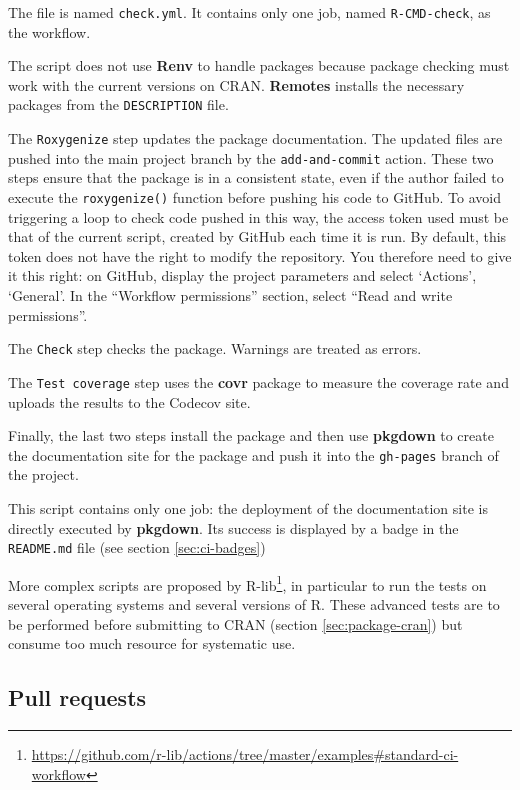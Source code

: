 \documentclass[
  12pt,
  american,
  a4paper,
  extrafontsizes,onecolumn,openright
  ]{memoir}
\newlength{\rf}
\begin{document}
The file is named \texttt{check.yml}.
It contains only one job, named \texttt{R-CMD-check}, as the workflow.

The script does not use \textbf{Renv} to handle packages because package checking must work with the current versions on CRAN.
\textbf{Remotes} installs the necessary packages from the \texttt{DESCRIPTION} file.

The \texttt{Roxygenize} step updates the package documentation.
The updated files are pushed into the main project branch by the \texttt{add-and-commit} action.
These two steps ensure that the package is in a consistent state, even if the author failed to execute the \texttt{roxygenize()} function before pushing his code to GitHub.
To avoid triggering a loop to check code pushed in this way, the access token used must be that of the current script, created by GitHub each time it is run.
By default, this token does not have the right to modify the repository.
You therefore need to give it this right: on GitHub, display the project parameters and select \enquote*{Actions}, \enquote*{General}.
In the \enquote{Workflow permissions} section, select \enquote{Read and write permissions}.

The \texttt{Check} step checks the package.
Warnings are treated as errors.

The \texttt{Test\ coverage} step uses the \textbf{covr} package to measure the coverage rate and uploads the results to the Codecov site.

Finally, the last two steps install the package and then use \textbf{pkgdown} to create the documentation site for the package and push it into the \texttt{gh-pages} branch of the project.

This script contains only one job: the deployment of the documentation site is directly executed by \textbf{pkgdown}.
Its success is displayed by a badge in the \texttt{README.md} file (see section \ref{sec:ci-badges})

More complex scripts are proposed by R-lib\footnote{\url{https://github.com/r-lib/actions/tree/master/examples\#standard-ci-workflow}}, in particular to run the tests on several operating systems and several versions of R.
These advanced tests are to be performed before submitting to CRAN (section \ref{sec:package-cran}) but consume too much resource for systematic use.

\subsection{Pull requests}\label{sec:ci-pr}
\end{document}

